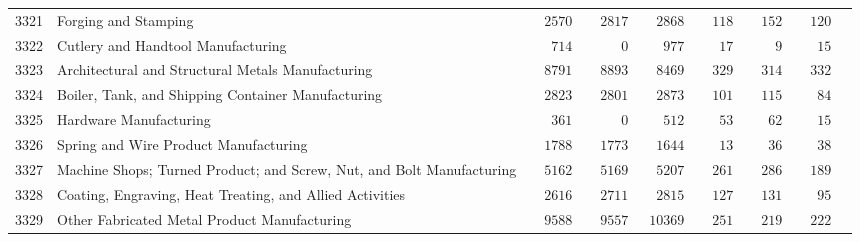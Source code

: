 \documentclass[9pt, oneside]{article}   	%
\begin{document}
\begin{longtable}{lp{3 in}ccccccc}
3321  & Forging and Stamping & $\phantom{00}2570$ & $\phantom{00}2817$ & $\phantom{00}2868$ & $\phantom{00}118$ & $\phantom{00}152$ & $\phantom{00}120$ \\
3322  & Cutlery and Handtool Manufacturing & $\phantom{000}714$ & $\phantom{00000}0$ & $\phantom{000}977$ & $\phantom{000}17$ & $\phantom{0000}9$ & $\phantom{000}15$ \\
3323  & Architectural and Structural Metals Manufacturing & $\phantom{00}8791$ & $\phantom{00}8893$ & $\phantom{00}8469$ & $\phantom{00}329$ & $\phantom{00}314$ & $\phantom{00}332$ \\
3324  & Boiler, Tank, and Shipping Container Manufacturing & $\phantom{00}2823$ & $\phantom{00}2801$ & $\phantom{00}2873$ & $\phantom{00}101$ & $\phantom{00}115$ & $\phantom{000}84$ \\
3325  & Hardware Manufacturing & $\phantom{000}361$ & $\phantom{00000}0$ & $\phantom{000}512$ & $\phantom{000}53$ & $\phantom{000}62$ & $\phantom{000}15$ \\
3326  & Spring and Wire Product Manufacturing & $\phantom{00}1788$ & $\phantom{00}1773$ & $\phantom{00}1644$ & $\phantom{000}13$ & $\phantom{000}36$ & $\phantom{000}38$ \\
3327  & Machine Shops; Turned Product; and Screw, Nut, and Bolt Manufacturing & $\phantom{00}5162$ & $\phantom{00}5169$ & $\phantom{00}5207$ & $\phantom{00}261$ & $\phantom{00}286$ & $\phantom{00}189$ \\
3328  & Coating, Engraving, Heat Treating, and Allied Activities & $\phantom{00}2616$ & $\phantom{00}2711$ & $\phantom{00}2815$ & $\phantom{00}127$ & $\phantom{00}131$ & $\phantom{000}95$ \\
3329  & Other Fabricated Metal Product Manufacturing & $\phantom{00}9588$ & $\phantom{00}9557$ & $\phantom{0}10369$ & $\phantom{00}251$ & $\phantom{00}219$ & $\phantom{00}222$ \\


\end{longtable}
\end{document}
